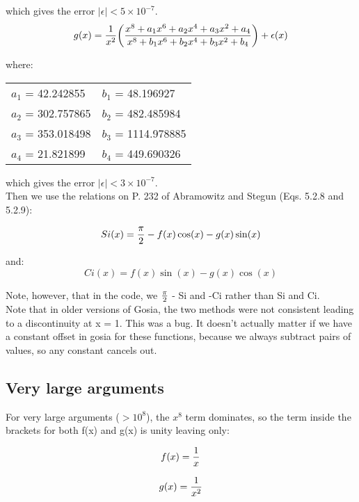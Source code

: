 \noindent which gives the error $|\epsilon| < 5 \times 10^{-7}$.\\

\begin{equation}
g(x) = {1 \over x^2}
\bigg({x^8 + a_1 x^6 + a_2 x^4 + a_3 x^2 + a_4 \over x^8 + b_1 x^6 + b_2 x^4 + b_3 x^2 + b_4}\bigg)
+ \epsilon(x)
\end{equation}

\noindent where:\\

\begin{center}
\begin{tabular}{|ll|}
\hline
$a_1$ = 42.242855 & $b_1$ = 48.196927\\
$a_2$ = 302.757865 & $b_2$ = 482.485984\\
$a_3$ = 353.018498 & $b_3$ = 1114.978885\\
$a_4$ = 21.821899 & $b_4$ = 449.690326\\
\hline
\end{tabular}
\end{center}

\noindent which gives the error $|\epsilon| < 3 \times 10^{-7}$.\\

Then we use the relations on P. 232 of Abramowitz and Stegun (Eqs.
5.2.8 and 5.2.9):

\begin{equation}
Si(x) = {\pi \over 2} - f(x) \cos(x) - g(x) \sin(x)
\end{equation}

\noindent and:\\

\begin{equation}
Ci(x) = f(x) \sin(x) - g(x) \cos(x)
\end{equation}

\noindent Note, however, that in the code, we ${\pi \over 2}$ - Si and -Ci
rather than Si and Ci.\\

\noindent Note that in older versions of Gosia, the two
methods were not consistent leading to a discontinuity at x = 1. This
was a bug. It doesn't actually matter if we have a constant offset in
gosia for these functions, because we always subtract pairs of values,
so any constant cancels out.\\

\subsection{Very large arguments}

\noindent For very large arguments ($> 10^8$), the $x^8$ term dominates, so
the term inside the brackets for both f(x) and g(x) is unity leaving only:

\begin{equation}
f(x) = {1 \over x}
\end{equation}

\begin{equation}
g(x) = {1 \over x^2}
\end{equation}
